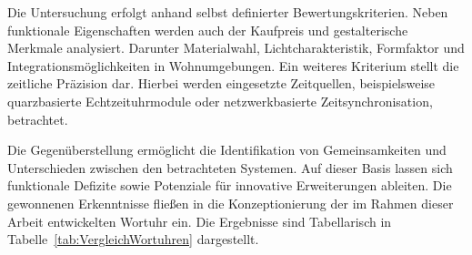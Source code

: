 Die Untersuchung erfolgt anhand selbst definierter Bewertungskriterien. 
Neben funktionale Eigenschaften werden auch der Kaufpreis und gestalterische Merkmale analysiert. 
Darunter Materialwahl, Lichtcharakteristik, Formfaktor und Integrationsmöglichkeiten in Wohnumgebungen. 
Ein weiteres Kriterium stellt die zeitliche Präzision dar. 
Hierbei werden eingesetzte Zeitquellen, beispielsweise quarzbasierte Echtzeituhrmodule oder netzwerkbasierte Zeitsynchronisation, betrachtet. 

Die Gegenüberstellung ermöglicht die Identifikation von Gemeinsamkeiten und Unterschieden zwischen den betrachteten Systemen. 
Auf dieser Basis lassen sich funktionale Defizite sowie Potenziale für innovative Erweiterungen ableiten. 
Die gewonnenen Erkenntnisse fließen in die Konzeptionierung der im Rahmen dieser Arbeit entwickelten Wortuhr ein.
Die Ergebnisse sind Tabellarisch in Tabelle~\ref{tab:VergleichWortuhren} dargestellt.


